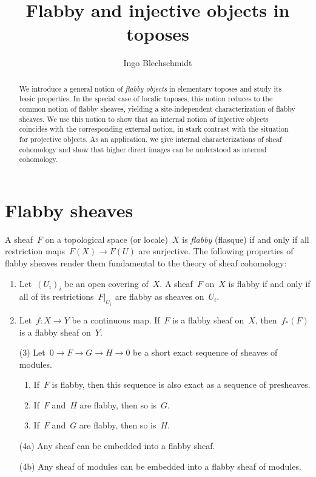 \documentclass[oneside]{amsart}
\title{Flabby and injective objects in toposes}
\author{Ingo Blechschmidt}
\theoremstyle{definition}
\theoremstyle{plain}
\theoremstyle{remark}
\renewcommand{\_}{\mathpunct{.}\,}
\begin{document}
\begin{abstract}
  We introduce a general notion of \emph{flabby objects} in elementary toposes
  and study its basic properties. In the special case of localic toposes, this
  notion reduces to the common notion of flabby sheaves, yielding a
  site-independent characterization of flabby sheaves. We use this notion to
  show that an internal notion of injective objects coincides with the
  corresponding external notion, in stark contrast with the situation for
  projective objects. As an application, we give internal characterizations of
  sheaf cohomology and show that higher direct images can be understood as
  internal cohomology.
\end{abstract}

\maketitle
\thispagestyle{empty}

\noindent

\section{Flabby sheaves}

A sheaf~$F$ on a topological space (or locale)~$X$ is \emph{flabby} (flasque) if and only
if all restriction maps~$F(X) \to F(U)$ are surjective. The following
properties of flabby sheaves render them fundamental to the theory of sheaf
cohomology:
\begin{enumerate}
\item Let~$(U_i)_i$ be an open covering of~$X$.
A sheaf~$F$ on~$X$ is flabby if and only if all of its restrictions~$F|_{U_i}$
are flabby as sheaves on~$U_i$.
\item Let~$f : X \to Y$ be a continuous map. If~$F$ is a flabby sheaf on~$X$,
then~$f_*(F)$ is a flabby sheaf on~$Y$.
\item[(3)] Let~$0 \to F \to G \to H \to 0$ be a short exact sequence of sheaves of
modules.
\begin{enumerate}
\item If~$F$ is flabby, then this sequence is also exact as a sequence of
presheaves.
\item If~$F$ and~$H$ are flabby, then so is~$G$.
\item If~$F$ and~$G$ are flabby, then so is~$H$.
\end{enumerate}
\item[(4a)] Any sheaf can be embedded into a flabby sheaf.
\item[(4b)] Any sheaf of modules can be embedded into a flabby sheaf of modules.
\end{enumerate}
\end{document}
